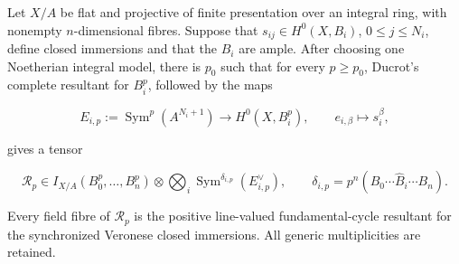 \begin{corollary}
\label{cor:p171-revised2-veronese-resultants}
Let \(X/A\) be flat and projective of finite presentation over an integral
ring, with nonempty \(n\)-dimensional fibres.  Suppose that
\(s_{ij}\in H^0(X,B_i)\), \(0\leq j\leq N_i\), define closed immersions and
that the \(B_i\) are ample.  After choosing one Noetherian integral model,
there is \(p_0\) such that for every \(p\geq p_0\), Ducrot's complete
resultant for \(B_i^p\), followed by the maps

\[
 E_{i,p}:=\operatorname{Sym}^p(A^{N_i+1})\longrightarrow H^0(X,B_i^p),
 \qquad e_{i,\beta}\longmapsto s_i^\beta,
\]

gives a tensor

\[
 \mathcal R_p\in I_{X/A}(B_0^p,\ldots,B_n^p)\otimes
 \bigotimes_i\operatorname{Sym}^{\delta_{i,p}}(E_{i,p}^\vee),
 \qquad
 \delta_{i,p}=p^n(B_0\cdots\widehat B_i\cdots B_n).
\]

Every field fibre of \(\mathcal R_p\) is the positive line-valued
fundamental-cycle resultant for the synchronized Veronese closed
immersions.  All generic multiplicities are retained.
\end{corollary}

